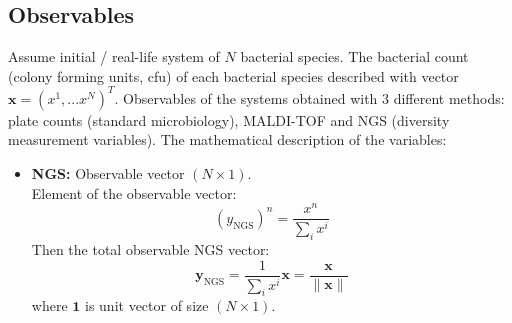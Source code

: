 \documentclass[10pt,A4paper]{article}
\begin{document}
\subsection{Observables}
Assume initial / real-life system of $N$ bacterial species.
The bacterial count (colony forming units, cfu) of each bacterial species described with vector $\mathbf{x} = (x^1, ... x^N)^T$.
Observables of the systems obtained with 3 different methods: plate counts (standard microbiology), MALDI-TOF and NGS (diversity measurement variables).
The mathematical description of the variables:
\begin{itemize}
    \item \textbf{NGS:} Observable vector $(N\times1)$.\\
    Element of the observable vector: 
    \begin{equation}
        (y_\text{NGS})^n = \frac{x^n}{\sum_i x^i}
    \end{equation}
    Then the total observable NGS vector: 
    \begin{equation}
        \boxed{\mathbf{y}_\text{NGS} = \frac{1}{\sum_i x^i} \mathbf{x} = \frac{\mathbf{x}}{\lVert \mathbf{x} \rVert}}
    \end{equation}
    where $\mathbf{1}$ is unit vector of size $(N\times1)$.


\end{itemize}
\end{document}
